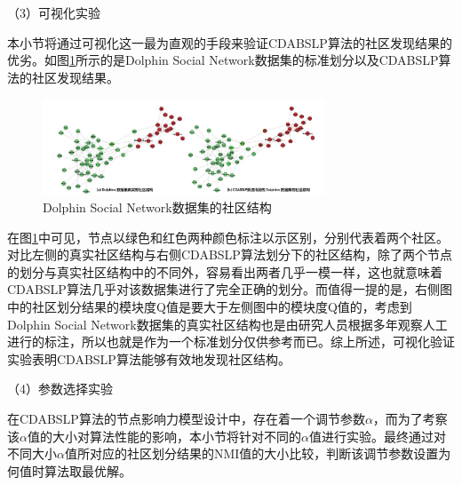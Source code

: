 （3）可视化实验

本小节将通过可视化这一最为直观的手段来验证CDABSLP算法的社区发现结果的优劣。如图\ref{fig:Dolphins}所示的是Dolphin Social Network数据集的标准划分以及CDABSLP算法的社区发现结果。

\begin{figure}
  \centering
  \includegraphics[width=0.75\textwidth]{figures/Dolphins}
  \caption{Dolphin Social Network数据集的社区结构}\label{fig:Dolphins}
\end{figure}

在图\ref{fig:Dolphins}中可见，节点以绿色和红色两种颜色标注以示区别，分别代表着两个社区。对比左侧的真实社区结构与右侧CDABSLP算法划分下的社区结构，除了两个节点的划分与真实社区结构中的不同外，容易看出两者几乎一模一样，这也就意味着CDABSLP算法几乎对该数据集进行了完全正确的划分。而值得一提的是，右侧图中的社区划分结果的模块度Q值是要大于左侧图中的模块度Q值的，考虑到Dolphin Social Network数据集的真实社区结构也是由研究人员根据多年观察人工进行的标注，所以也就是作为一个标准划分仅供参考而已。综上所述，可视化验证实验表明CDABSLP算法能够有效地发现社区结构。

（4）参数选择实验

在CDABSLP算法的节点影响力模型设计中，存在着一个调节参数$\alpha$，而为了考察该$\alpha$值的大小对算法性能的影响，本小节将针对不同的$\alpha$值进行实验。最终通过对不同大小$\alpha$值所对应的社区划分结果的NMI值的大小比较，判断该调节参数设置为何值时算法取最优解。

